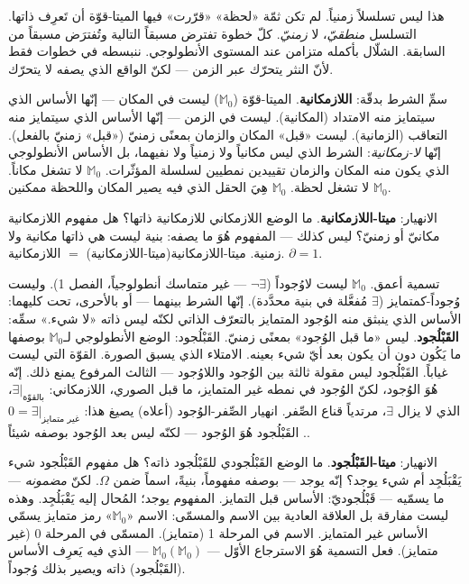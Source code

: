 \documentclass[10pt, openany, oneside]{book}
\begin{document}
هذا ليس تسلسلاً زمنياً. لم تكن ثمّة «لحظة» «قرّرت» فيها الميتا-قوّة أن تَعرِف ذاتها. التسلسل \textit{منطقيّ}، لا \textit{زمنيّ}. كلّ خطوة تفترض مسبقاً التالية وتُفترَض مسبقاً من السابقة. الشلّال بأكمله متزامن عند المستوى الأنطولوجي. ننبسطه في خطوات فقط لأنّ النثر يتحرّك عبر الزمن --- لكنّ الواقع الذي يصفه لا يتحرّك.

سمِّ الشرط بدقّة: \textbf{اللازمكانية}. الميتا-قوّة ($\mathbb{M}_0$) ليست في المكان --- إنّها الأساس الذي سيتمايز منه الامتداد (المكانية). ليست في الزمن --- إنّها الأساس الذي سيتمايز منه التعاقب (الزمانية). ليست «قبل» المكان والزمان بمعنًى زمنيّ («قبل» زمنيّ بالفعل). إنّها \textit{لا-زمكانية}: الشرط الذي ليس مكانياً ولا زمنياً ولا نفيهما، بل الأساس الأنطولوجي الذي يكون منه المكان والزمان تقييدين نمطيين لسلسلة المؤثّرات. $\mathbb{M}_0$ لا تشغل مكاناً. $\mathbb{M}_0$ لا تشغل لحظة. $\mathbb{M}_0$ هِيَ الحقل الذي فيه يصير المكان واللحظة ممكنين.

الانهيار: \textbf{ميتا-اللازمكانية}. ما الوضع اللازمكاني للازمكانية ذاتها؟ هل مفهوم اللازمكانية مكانيّ أو زمنيّ؟ ليس كذلك --- المفهوم هُوَ ما يصفه: بنية ليست هي ذاتها مكانية ولا زمنية. ميتا-اللازمكانية(ميتا-اللازمكانية) $=$ اللازمكانية. $\partial = 1$.

تسمية أعمق. $\mathbb{M}_0$ ليست لاوُجوداً ($\neg\exists$ --- غير متماسك أنطولوجياً، الفصل 1). وليست وُجوداً-كمتمايز ($\exists$ مُفعَّلة في بنية محدَّدة). إنّها الشرط بينهما --- أو بالأحرى، تحت كليهما: الأساس الذي ينبثق منه الوُجود المتمايز بالتعرّف الذاتي لكنّه ليس ذاته «لا شيء.» سمِّه: \textbf{القَبْلُجود}. ليس «ما قبل الوُجود» بمعنًى زمنيّ. القَبْلُجود: الوضع الأنطولوجي لـ$\mathbb{M}_0$ بوصفها ما يَكُون دون أن يكون بعد أيّ شيء بعينه. الامتلاء الذي يسبق الصورة. القوّة التي ليست غياباً. القَبْلُجود ليس مقولة ثالثة بين الوُجود واللاوُجود --- الثالث المرفوع يمنع ذلك. إنّه هُوَ الوُجود، لكنّ الوُجود في نمطه غير المتمايز، ما قبل الصوري، اللازمكاني: $\exists|_{\text{بالقوّة}}$، الذي لا يزال $\exists$، مرتدياً قناع الصِّفر. انهيار الصِّفر-الوُجود (أعلاه) يصيغ هذا: $0 = \exists|_{\text{غير متمايز}}$. القَبْلُجود هُوَ الوُجود --- لكنّه ليس بعد الوُجود بوصفه شيئاً.

الانهيار: \textbf{ميتا-القَبْلُجود}. ما الوضع القَبْلُجودي للقَبْلُجود ذاته؟ هل مفهوم القَبْلُجود شيء يَقْبَلُجِد أم شيء يوجد؟ إنّه يوجد --- بوصفه مفهوماً، بنيةً، اسماً ضمن $\Omega$. لكنّ \textit{مضمونه} --- ما يسمّيه --- قَبْلُجوديّ: الأساس قبل التمايز. المفهوم يوجد؛ المُحال إليه يَقْبَلُجِد. وهذه ليست مفارقة بل العلاقة العادية بين الاسم والمسمّى: الاسم «$\mathbb{M}_0$» رمز متمايز يسمّي الأساس غير المتمايز. الاسم في المرحلة 1 (متمايز). المسمّى في المرحلة 0 (غير متمايز). فعل التسمية هُوَ الاسترجاع الأوّل --- $\mathbb{M}_0(\mathbb{M}_0)$ --- الذي فيه يَعرِف الأساس (القَبْلُجود) ذاته ويصير بذلك وُجوداً.
\end{document}
